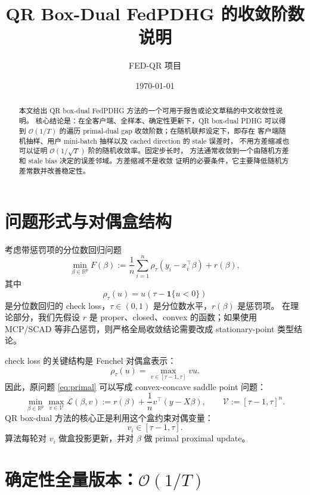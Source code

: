 \documentclass[UTF8,a4paper,11pt]{ctexart}
\title{QR Box-Dual FedPDHG 的收敛阶数说明}
\author{FED-QR 项目}
\date{\today}
\begin{document}
\maketitle

\begin{abstract}
本文给出 QR box-dual FedPDHG 方法的一个可用于报告或论文草稿的中文收敛性说明。
核心结论是：在全客户端、全样本、确定性更新下，QR box-dual PDHG 可以得到
$\mathcal{O}(1/T)$ 的遍历 primal-dual gap 收敛阶数；在随机联邦设定下，即存在
客户端随机抽样、用户 mini-batch 抽样以及 cached direction 的 stale 误差时，
不用方差缩减也可以证明 $\mathcal{O}(1/\sqrt{T})$ 阶的随机收敛率。固定步长时，
方法通常收敛到一个由随机方差和 stale bias 决定的误差邻域。方差缩减不是收敛
证明的必要条件，它主要降低随机方差常数并改善稳定性。
\end{abstract}

\section{问题形式与对偶盒结构}

考虑带惩罚项的分位数回归问题
\begin{equation}
    \min_{\beta\in\mathbb{R}^p}
    F(\beta)
    :=
    \frac{1}{n}
    \sum_{i=1}^n
    \rho_\tau(y_i-x_i^\top\beta)
    +
    r(\beta),
    \label{eq:primal}
\end{equation}
其中
\[
    \rho_\tau(u)=u(\tau-\mathbf{1}\{u<0\})
\]
是分位数回归的 check loss，$\tau\in(0,1)$ 是分位数水平，$r(\beta)$ 是惩罚项。
在理论部分，我们先假设 $r$ 是 proper、closed、convex 的函数；如果使用
MCP/SCAD 等非凸惩罚，则严格全局收敛结论需要改成 stationary-point 类型结论。

check loss 的关键结构是 Fenchel 对偶盒表示：
\begin{equation}
    \rho_\tau(u)
    =
    \max_{v\in[\tau-1,\tau]} vu .
\end{equation}
因此，原问题 \eqref{eq:primal} 可以写成 convex-concave saddle point 问题：
\begin{equation}
    \min_{\beta\in\mathbb{R}^p}
    \max_{v\in\mathcal{V}}
    \mathcal{L}(\beta,v)
    :=
    r(\beta)
    +
    \frac{1}{n}
    v^\top (y-X\beta),
    \qquad
    \mathcal{V}:=[\tau-1,\tau]^n .
    \label{eq:saddle}
\end{equation}
QR box-dual 方法的核心正是利用这个盒约束对偶变量：
\[
    v_i\in[\tau-1,\tau].
\]
算法每轮对 $v_i$ 做盒投影更新，并对 $\beta$ 做 primal proximal update。

\section{确定性全量版本：$\mathcal{O}(1/T)$}
\end{document}
